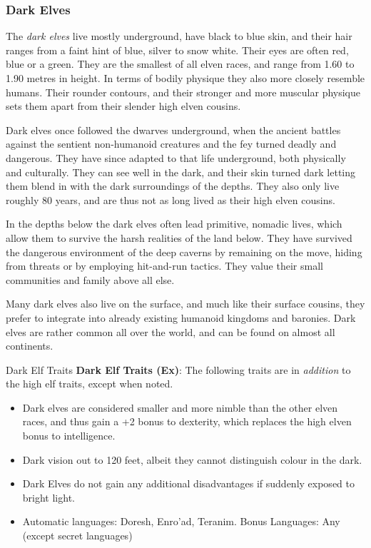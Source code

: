 \subsubsection{Dark Elves}
\label{sec:Dark Elves}

The \emph{dark elves} live mostly underground, have black to blue skin, and
their hair ranges from a faint hint of blue, silver to snow white. Their eyes
are often red, blue or a green. They are the smallest of all elven races, and
range from 1.60 to 1.90 metres in height. In terms of bodily physique they
also more closely resemble humans. Their rounder contours, and their stronger
and more muscular physique sets them apart from their slender high elven
cousins.

Dark elves once followed the dwarves underground, when the ancient battles
against the sentient non-humanoid creatures and the fey turned deadly and
dangerous. They have since adapted to that life underground, both physically
and culturally. They can see well in the dark, and their skin turned dark
letting them blend in with the dark surroundings of the depths. They also only
live roughly 80 years, and are thus not as long lived as their high elven
cousins.

In the depths below the dark elves often lead primitive, nomadic lives, which
allow them to survive the harsh realities of the land below. They have
survived the dangerous environment of the deep caverns by remaining on the
move, hiding from threats or by employing hit-and-run tactics. They value
their small communities and family above all else.

Many dark elves also live on the surface, and much like their surface cousins,
they prefer to integrate into already existing humanoid kingdoms and baronies.
Dark elves are rather common all over the world, and can be found on almost all
continents.

\begin{35e}{Dark Elf Traits}
  \textbf{Dark Elf Traits (Ex)}: The following traits are in \emph{addition}
  to the high elf traits, except when noted.
  \begin{itemize}[noitemsep]
    \item Dark elves are considered smaller and more nimble than the other
      elven races, and thus gain a +2 bonus to dexterity, which replaces the
      high elven bonus to intelligence.
    \item Dark vision out to 120 feet, albeit they cannot distinguish colour
      in the dark.
    \item Dark Elves do not gain any additional disadvantages if suddenly
      exposed to bright light.
    \item Automatic languages: Doresh, Enro'ad, Teranim. Bonus Languages: Any
      (except secret languages)
  \end{itemize}
\end{35e}

